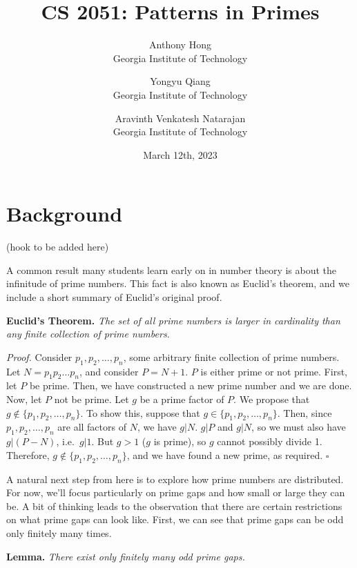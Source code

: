 \documentclass[12pt, letterpaper]{article}
\title{CS 2051: Patterns in Primes}
\author{Anthony Hong \\ Georgia Institute of Technology
\and Yongyu Qiang \\ Georgia Institute of Technology
\and Aravinth Venkatesh Natarajan \\ Georgia Institute of Technology}
\date{March 12th, 2023}
\begin{document}
\maketitle

\section{Background}
(hook to be added here)

A common result many students learn early on in number theory is about the
infinitude of prime numbers. This fact is also known as Euclid's theorem,
and we include a short summary of Euclid's original proof.

\noindent
\textbf{Euclid's Theorem.} \textit{The set of all prime numbers is larger
in cardinality than any finite collection of prime numbers.}

\noindent
\textit{Proof.} Consider $p_1, p_2, \dots, p_n$, some arbitrary finite
collection of
prime numbers. Let $N = p_1p_2 \dots p_n$, and consider $P = N + 1$. $P$ is
either prime or not prime.
\newline\indent
First, let $P$ be prime. Then, we have constructed a new prime number and
we are done.
\newline\indent
Now, let $P$ not be prime. Let $g$ be a prime factor of $P$. We propose that
$g \notin \{p_1, p_2, \dots, p_n\}$. To show this, suppose that
$g \in \{p_1, p_2, \dots, p_n\}$. Then, since $p_1, p_2, \dots, p_n$ are all
factors of $N$, we have $g | N$. $g | P$ and $g | N$, so
we must also have $g | (P - N)$, i.e.\ $g | 1$. But $g > 1$ ($g$ is prime),
so $g$ cannot possibly divide 1. Therefore,
$g \notin \{p_1, p_2, \dots, p_n\}$, and we have found a new prime, as
required. \hfill$\square$

A natural next step from here is to explore how prime numbers
are distributed. For now, we'll focus particularly on prime
gaps and how small or large they can be. A bit of
thinking leads to the observation that there are certain
restrictions on what prime gaps can look like. First,
we can see that prime gaps can be odd only finitely many
times.

\noindent
\textbf{Lemma.} \textit{There exist only finitely many odd prime
gaps.}
\end{document}

